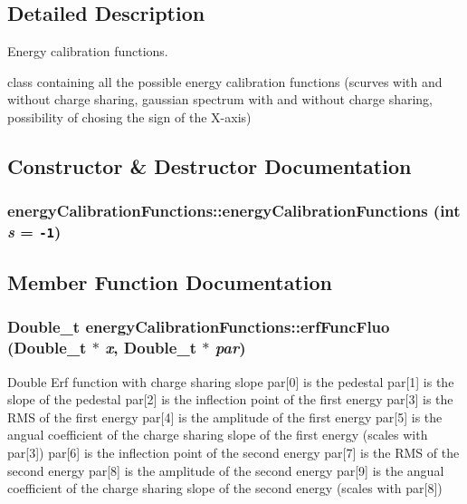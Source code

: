 \subsection{Detailed Description}
Energy calibration functions. 

class containing all the possible energy calibration functions (scurves with and without charge sharing, gaussian spectrum with and without charge sharing, possibility of chosing the sign of the X-axis) 



\subsection{Constructor \& Destructor Documentation}
\subsubsection{\setlength{\rightskip}{0pt plus 5cm}energy\-Calibration\-Functions::energy\-Calibration\-Functions (int {\em s} = {\tt -1})\hspace{0.3cm}{\tt  [inline]}}\label{classenergyCalibrationFunctions_8c17162b89f3b2e642004e7c88a22ac2}




\subsection{Member Function Documentation}
\subsubsection{\setlength{\rightskip}{0pt plus 5cm}Double\_\-t energy\-Calibration\-Functions::erf\-Func\-Fluo (Double\_\-t $\ast$ {\em x}, Double\_\-t $\ast$ {\em par})}\label{classenergyCalibrationFunctions_a5fbe9da48bc2ef90b699e06ea8c5111}


Double Erf function with charge sharing slope par[0] is the pedestal par[1] is the slope of the pedestal par[2] is the inflection point of the first energy par[3] is the RMS of the first energy par[4] is the amplitude of the first energy par[5] is the angual coefficient of the charge sharing slope of the first energy (scales with par[3]) par[6] is the inflection point of the second energy par[7] is the RMS of the second energy par[8] is the amplitude of the second energy par[9] is the angual coefficient of the charge sharing slope of the second energy (scales with par[8]) 
